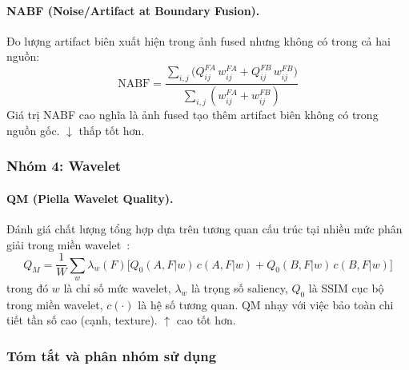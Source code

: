 \paragraph{NABF (Noise/Artifact at Boundary Fusion).}
Đo lượng artifact biên xuất hiện trong ảnh fused nhưng không có trong cả hai nguồn:
\begin{equation}
\mathrm{NABF} = \frac{\sum_{i,j}\bigl(Q^{FA}_{ij}\,w^{FA}_{ij} + Q^{FB}_{ij}\,w^{FB}_{ij}\bigr)}{\sum_{i,j}(w^{FA}_{ij}+w^{FB}_{ij})}
\end{equation}
Giá trị NABF cao nghĩa là ảnh fused tạo thêm artifact biên không có trong nguồn gốc. $\downarrow$ thấp tốt hơn.

\subsubsection*{Nhóm 4: Wavelet}

\paragraph{QM (Piella Wavelet Quality).}
Đánh giá chất lượng tổng hợp dựa trên tương quan cấu trúc tại nhiều mức phân giải trong miền wavelet~\cite{piella2003new}:
\begin{equation}
Q_M = \frac{1}{W}\sum_w \lambda_w(F)\bigl[Q_0(A,F|w)\,c(A,F|w) + Q_0(B,F|w)\,c(B,F|w)\bigr]
\end{equation}
trong đó $w$ là chỉ số mức wavelet, $\lambda_w$ là trọng số saliency, $Q_0$ là SSIM cục bộ trong miền wavelet, $c(\cdot)$ là hệ số tương quan. QM nhạy với việc bảo toàn chi tiết tần số cao (cạnh, texture). $\uparrow$ cao tốt hơn.

\subsubsection*{Tóm tắt và phân nhóm sử dụng}

